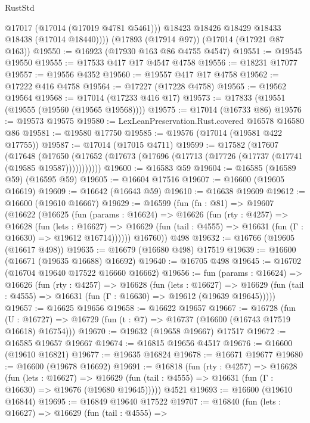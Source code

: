 \begin{lexlean}{RustStd}
\begin{coremodule}
{\begin{coremodule}
{{{{{{{{{{{{{{{{{{{{{{{{{{{{{{{{{{{{{{{{{{{{{{{{{{{{{{{            @17017
            (@17014 (@17019 @4781 @5461)))
          @18423
          @18426
          @18429
          @18433
          @18438
          (@17014 @18440))))
    (@17893 (@17914 @97))
    (@17014 (@17921 @87 @163))
@19550 := @16923 (@17930 @163 @86 @4755 @4547)
@19551 := @19545 @19550
@19555 := @17533 @417 @17 @4547 @4758
@19556 := @18231 @17077
@19557 := @19556 @4352
@19560 := @19557 @417 @17 @4758
@19562 := @17222 @416 @4758
@19564 := @17227 (@17228 @4758)
@19565 := @19562 @19564
@19568 := @17014 (@17233 @416 @17)
@19573 := @17833 (@19551 (@19555 (@19560 (@19565 @19568))))
@19575 := @17014 (@16733 @86)
@19576 := @19573 @19575
@19580 := LexLeanPreservation.Rust.covered @16578 @16580 @86
@19581 := @19580 @17750
@19585 := @19576 (@17014 (@19581 @422 @17755))
@19587 := @17014 (@17015 @4711)
@19599 := @17582
    (@17607
      (@17648
        (@17650 (@17652 (@17673 (@17696 (@17713 (@17726 (@17737 (@17741 (@19585 @19587)))))))))))
@19600 := @16583 @59
@19604 := @16585 (@16589 @59) (@16595 @59)
@19605 := @16604 @17516
@19607 := @16600 (@19605 @16619)
@19609 := @16642 (@16643 @59)
@19610 := @16638 @19609
@19612 := @16600 (@19610 @16667)
@19629 := @16599
    (fun (fn : @81) =>
    @19607
      (@16622
        (@16625
          (fun (params : @16624) =>
          @16626
            (fun (rty : @4257) =>
            @16628
              (fun (lets : @16627) =>
              @16629 (fun (tail : @4555) => @16631 (fun (Γ : @16630) => @19612 @16714))))))
        @16760))
    @498
@19632 := @16766 (@19605 (@16617 @498))
@19635 := @16679 (@16680 @498) @17519
@19639 := @16600 (@16671 (@19635 @16688) @16692)
@19640 := @16705 @498
@19645 := @16702 (@16704 @19640 @17522 @16660 @16662)
@19656 := fun (params : @16624) =>
  @16626
    (fun (rty : @4257) =>
    @16628
      (fun (lets : @16627) =>
      @16629 (fun (tail : @4555) => @16631 (fun (Γ : @16630) => @19612 (@19639 @19645)))))
@19657 := @16625 @19656
@19658 := @16622 @19657
@19667 := @16728
    (fun (U : @16727) => @16729 (fun (t : @7) => @16737 (@16600 (@16743 @17519 @16618) @16754)))
@19670 := @19632 (@19658 @19667) @17517
@19672 := @16585 @19657 @19667
@19674 := @16815 @19656 @4517
@19676 := @16600 (@19610 @16821)
@19677 := @19635 @16824
@19678 := @16671 @19677
@19680 := @16600 (@19678 @16692)
@19691 := @16818
    (fun (rty : @4257) =>
    @16628
      (fun (lets : @16627) =>
      @16629 (fun (tail : @4555) => @16631 (fun (Γ : @16630) => @19676 (@19680 @19645)))))
    @4521
@19693 := @16600 (@19610 @16844)
@19695 := @16849 @19640 @17522
@19707 := @16840
    (fun (lets : @16627) =>
    @16629
      (fun (tail : @4555) =>
}}}}}}}}}}}}}}}}}}}}}}}}}}}}}}}}}}}}}}}}}}}}}}}}}}}}}}}
\end{coremodule}}
\end{coremodule}
\end{lexlean}
